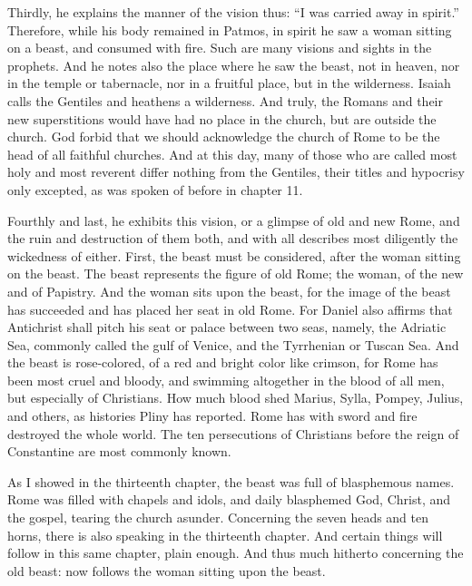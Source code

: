 Thirdly, he explains the manner of the vision thus: “I was carried away in spirit.” Therefore, while his body remained in Patmos, in spirit he saw a woman sitting on a beast, and consumed with fire. Such are many visions and sights in the prophets. And he notes also the place where he saw the beast, not in heaven, nor in the temple or tabernacle, nor in a fruitful place, but in the wilderness. Isaiah calls the Gentiles and heathens a wilderness. And truly, the Romans and their new superstitions would have had no place in the church, but are outside the church. God forbid that we should acknowledge the church of Rome to be the head of all faithful churches. And at this day, many of those who are called most holy and most reverent differ nothing from the Gentiles, their titles and hypocrisy only excepted, as was spoken of before in chapter 11.

Fourthly and last, he exhibits this vision, or a glimpse of old and new Rome, and the ruin and destruction of them both, and with all describes most diligently the wickedness of either. First, the beast must be considered, after the woman sitting on the beast. The beast represents the figure of old Rome; the woman, of the new and of Papistry. And the woman sits upon the beast, for the image of the beast has succeeded and has placed her seat in old Rome. For Daniel also affirms that Antichrist shall pitch his seat or palace between two seas, namely, the Adriatic Sea, commonly called the gulf of Venice, and the Tyrrhenian or Tuscan Sea. And the beast is rose-colored, of a red and bright color like crimson, for Rome has been most cruel and bloody, and swimming altogether in the blood of all men, but especially of Christians. How much blood shed Marius, Sylla, Pompey, Julius, and others, as histories Pliny has reported. Rome has with sword and fire destroyed the whole world. The ten persecutions of Christians before the reign of Constantine are most commonly known.

As I showed in the thirteenth chapter, the beast was full of blasphemous names. Rome was filled with chapels and idols, and daily blasphemed God, Christ, and the gospel, tearing the church asunder. Concerning the seven heads and ten horns, there is also speaking in the thirteenth chapter. And certain things will follow in this same chapter, plain enough. And thus much hitherto concerning the old beast: now follows the woman sitting upon the beast.
